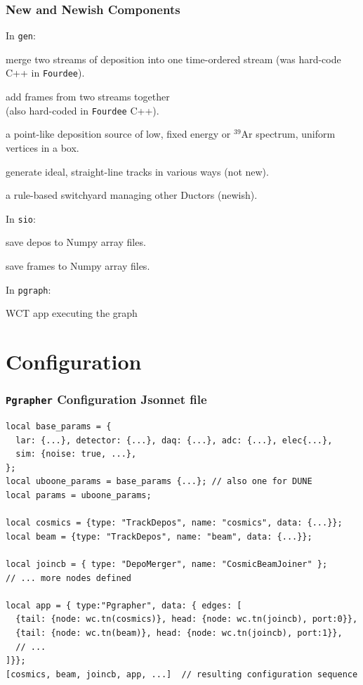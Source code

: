 \documentclass[xcolor=dvipsnames]{beamer}
\begin{document}
\begin{frame}
  \frametitle{New and Newish Components}
  In \texttt{gen}:
  \begin{description}\footnotesize
  \item[DepoMerger] merge two streams of deposition into one
    time-ordered stream (was hard-code C++ in \texttt{Fourdee}).
  \item[FrameSummer] add frames from two streams together \\ (also hard-coded in \texttt{Fourdee} C++).
  \item[BlipSource] a point-like deposition source of low, fixed
    energy or $^{39}$Ar spectrum, uniform vertices in a box.
  \item[TrackDespos] generate ideal, straight-line tracks in various ways (not new).
  \item[MultiDuctor] a rule-based switchyard managing other Ductors (newish).
  \end{description}
  In \texttt{sio}:
  \begin{description}\footnotesize
  \item[NumpyDepoSaver] save depos to Numpy array files.
  \item[NumpyFrameSaver] save frames to Numpy array files.
  \end{description}
  In \texttt{pgraph}:
  \begin{description}\footnotesize
  \item[Pgrapher] WCT app executing the graph
  \end{description}
\end{frame}

\section{Configuration}
\begin{frame}
\end{frame}

\begin{frame}[fragile]
  \frametitle{\texttt{Pgrapher} Configuration Jsonnet file}
\scriptsize
\begin{verbatim}
local base_params = { 
  lar: {...}, detector: {...}, daq: {...}, adc: {...}, elec{...},
  sim: {noise: true, ...},
};
local uboone_params = base_params {...}; // also one for DUNE
local params = uboone_params;

local cosmics = {type: "TrackDepos", name: "cosmics", data: {...}};
local beam = {type: "TrackDepos", name: "beam", data: {...}};

local joincb = { type: "DepoMerger", name: "CosmicBeamJoiner" };
// ... more nodes defined

local app = { type:"Pgrapher", data: { edges: [
  {tail: {node: wc.tn(cosmics)}, head: {node: wc.tn(joincb), port:0}},
  {tail: {node: wc.tn(beam)}, head: {node: wc.tn(joincb), port:1}},
  // ...
]}};
[cosmics, beam, joincb, app, ...]  // resulting configuration sequence
\end{verbatim}
\end{frame}
\end{document}
